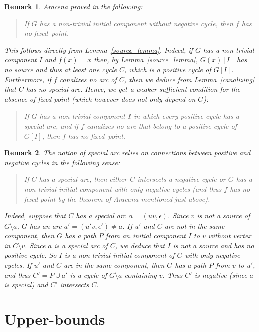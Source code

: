 \documentclass[11pt,a4paper]{article}
\newtheorem{remark}{Remark}
\def\e{\epsilon}
\begin{document}
\begin{remark}
{\em Aracena proved in \cite{A08} the following: 
\begin{quote}
{\em If $G$ has a non-trivial initial component without negative cycle, then $f$ has no fixed~point.} 
\end{quote}
This follows directly from Lemma~\ref{source_lemma}. Indeed, if $G$ has a non-trivial component $I$ and $f(x)=x$ then, by Lemma~\ref{source_lemma}, $G(x)[I]$ has no source and thus at least one cycle $C$, which is a positive cycle of $G[I]$. Furthermore, if $f$ canalizes no arc of $C$, then we deduce from Lemma~\ref{canalizing} that $C$ has no special arc. Hence, we get a weaker sufficient condition for the absence of fixed point (which however does not only depend on $G$):}
\begin{quote}
If $G$ has a non-trivial component $I$ in which every positive cycle has a special arc, and if $f$ canalizes no arc that belong to a positive cycle of $G[I]$, then $f$ has no fixed~point.
\end{quote}
\end{remark}

\begin{remark}
{\em The notion of special arc relies on connections between positive and negative cycles in the following sense:
\begin{quote}
{\em If $C$ has a special arc, then either $C$ intersects a negative cycle or $G$ has a non-trivial initial component with only negative cycles} (and thus $f$ has no fixed point by the theorem of Aracena mentioned just above). 
\end{quote}
Indeed, suppose that $C$ has a special arc $a=(uv,\e)$. Since $v$ is not a source of $G\setminus a$, $G$ has an arc $a'=(u'v,\e')\neq a$. If $u'$ and $C$ are not in the same  component, then $G$ has a path $P$ from an initial component $I$ to $v$ without vertex in $C\setminus v$. Since $a$ is a special arc of $C$, we deduce that $I$ is not a source and has no positive cycle. So $I$ is a non-trivial initial component of $G$ with only negative cycles. If $u'$ and $C$ are in the same component, then $G$ has a path $P$ from $v$ to $u'$, and thus $C'=P\cup a'$ is a cycle of $G\setminus a$ containing $v$. Thus $C'$ is negative (since $a$ is special) and $C'$ intersects $C$.}
\end{remark}

\section{Upper-bounds}\label{sec:upperbound}
\end{document}

